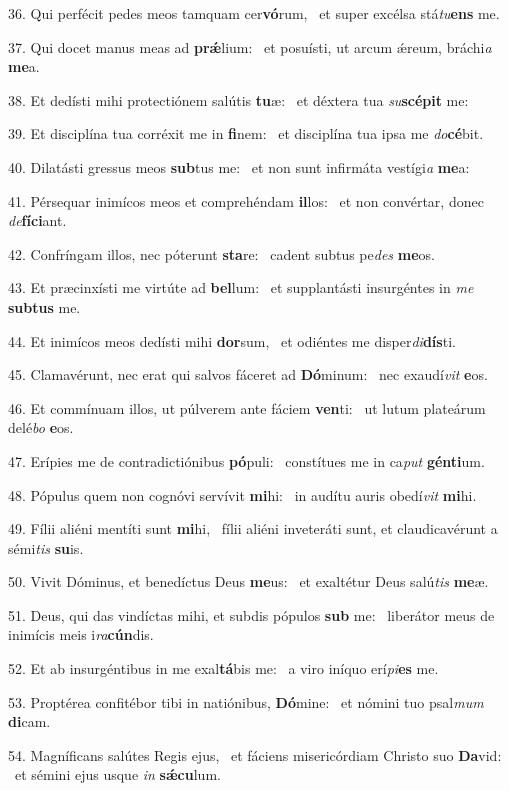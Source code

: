 36. Qui perfécit pedes meos tamquam cer\textbf{vó}rum, \ast\  et super excélsa stá\textit{tu}\textbf{ens} me.\

37. Qui docet manus meas ad \textbf{prǽ}lium: \ast\  et posuísti, ut arcum ǽreum, bráchi\textit{a} \textbf{me}a.\

38. Et dedísti mihi protectiónem salútis \textbf{tu}æ: \ast\  et déxtera tua \textit{su}\textbf{scé}\textbf{pit} me:\

39. Et disciplína tua corréxit me in \textbf{fi}nem: \ast\  et disciplína tua ipsa me \textit{do}\textbf{cé}bit.\

40. Dilatásti gressus meos \textbf{sub}tus me: \ast\  et non sunt infirmáta vestígi\textit{a} \textbf{me}a:\

41. Pérsequar inimícos meos et comprehéndam \textbf{il}los: \ast\  et non convértar, donec \textit{de}\textbf{fí}\textbf{ci}ant.\

42. Confríngam illos, nec póterunt \textbf{sta}re: \ast\  cadent subtus pe\textit{des} \textbf{me}os.\

43. Et præcinxísti me virtúte ad \textbf{bel}lum: \ast\  et supplantásti insurgéntes in \textit{me} \textbf{sub}\textbf{tus} me.\

44. Et inimícos meos dedísti mihi \textbf{dor}sum, \ast\  et odiéntes me disper\textit{di}\textbf{dís}ti.\

45. Clamavérunt, nec erat qui salvos fáceret ad \textbf{Dó}minum: \ast\  nec exaudí\textit{vit} \textbf{e}os.\

46. Et commínuam illos, ut púlverem ante fáciem \textbf{ven}ti: \ast\  ut lutum plateárum delé\textit{bo} \textbf{e}os.\

47. Erípies me de contradictiónibus \textbf{pó}puli: \ast\  constítues me in ca\textit{put} \textbf{gén}\textbf{ti}um.\

48. Pópulus quem non cognóvi servívit \textbf{mi}hi: \ast\  in audítu auris obedí\textit{vit} \textbf{mi}hi.\

49. Fílii aliéni mentíti sunt \textbf{mi}hi, \ast\  fílii aliéni inveteráti sunt, et claudicavérunt a sémi\textit{tis} \textbf{su}is.\

50. Vivit Dóminus, et benedíctus Deus \textbf{me}us: \ast\  et exaltétur Deus salú\textit{tis} \textbf{me}æ.\

51. Deus, qui das vindíctas mihi, et subdis pópulos \textbf{sub} me: \ast\  liberátor meus de inimícis meis i\textit{ra}\textbf{cún}dis.\

52. Et ab insurgéntibus in me exal\textbf{tá}bis me: \ast\  a viro iníquo erí\textit{pi}\textbf{es} me.\

53. Proptérea confitébor tibi in natiónibus, \textbf{Dó}mine: \ast\  et nómini tuo psal\textit{mum} \textbf{di}cam.\

54. Magníficans salútes Regis ejus, \dag\  et fáciens misericórdiam Christo suo \textbf{Da}vid: \ast\  et sémini ejus usque \textit{in} \textbf{sǽ}\textbf{cu}lum.\

